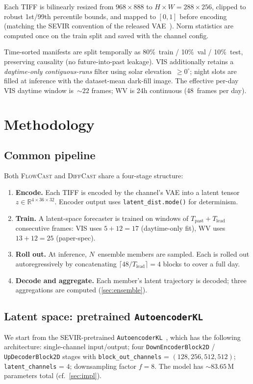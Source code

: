 \documentclass[11pt,a4paper]{article}
\begin{document}
Each {TIFF} is bilinearly resized from $968\times888$ to $H\times
W=288\times256$, clipped to robust 1st/99th percentile bounds, and mapped
to $[0,1]$ before encoding (matching the {SEVIR} convention of the released
{VAE}~\citep{flowcast2026}). Norm statistics are computed once on the train
split and saved with the channel config.

Time-sorted manifests are split temporally as 80\%~train / 10\%~val /
10\%~test, preserving causality (no future-into-past leakage). VIS
additionally retains a \emph{daytime-only contiguous-runs} filter using
solar elevation~$\geq 0^{\circ}$; night slots are filled at inference with
the dataset-mean dark-fill image. The effective per-day VIS daytime window
is~$\sim22$ frames; WV is 24h continuous (48~frames per day).

\section{Methodology}
\label{sec:method}

\subsection{Common pipeline}
\label{sec:pipeline}
Both \textsc{FlowCast} and \textsc{DiffCast} share a four-stage structure:

\begin{enumerate}[leftmargin=*]
\item \textbf{Encode.} Each {TIFF} is encoded by the channel's {VAE} into
      a latent tensor $z\in\mathbb{R}^{4\times 36\times 32}$. Encoder
      output uses \texttt{latent\_dist.mode()} for determinism.
\item \textbf{Train.} A latent-space forecaster is trained on windows of
      $T_{\text{past}}+T_{\text{lead}}$ consecutive frames: VIS uses
      $5+12=17$ (daytime-only fit), WV uses $13+12=25$ (paper-spec).
\item \textbf{Roll out.} At inference, $N$~ensemble members are sampled.
      Each is rolled out autoregressively by concatenating
      $\lceil 48/T_{\text{lead}}\rceil=4$ blocks to cover a full day.
\item \textbf{Decode and aggregate.} Each member's latent trajectory is
      decoded; three aggregations are computed (\cref{sec:ensemble}).
\end{enumerate}

\subsection{Latent space: pretrained \texttt{AutoencoderKL}}
\label{sec:vae}
We start from the {SEVIR}-pretrained \texttt{AutoencoderKL}~\citep{rombach2022ldm,flowcast2026},
which has the following architecture: single-channel input/output;
four \texttt{DownEncoderBlock2D} / \texttt{UpDecoderBlock2D} stages with
\texttt{block\_out\_channels} = $(128, 256, 512, 512)$;
\texttt{latent\_channels} = $4$; downsampling factor $f=8$. The model has
$\sim83.65$\,M parameters total (cf.\ \cref{sec:impl}).
\end{document}
